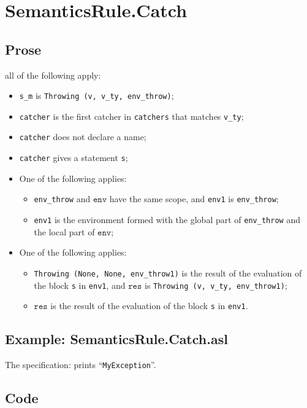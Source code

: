 \documentclass{book}
\newcommand\env[0]{\texttt{env}}
\newcommand\vres[0]{\texttt{res}}
\begin{document}
\section{SemanticsRule.Catch \label{sec:SemanticsRule.Catch}}

    \subsection{Prose}
    all of the following apply:
    \begin{itemize}
    \item \texttt{s\_m} is \texttt{Throwing (v, v\_ty, env\_throw)};
    \item \texttt{catcher} is the first catcher in \texttt{catchers} that matches \texttt{v\_ty};
    \item \texttt{catcher} does not declare a name;
    \item \texttt{catcher} gives a statement \texttt{s};
    \item One of the following applies:
      \begin{itemize}
      \item \texttt{env\_throw} and $\env$ have the same scope, and \texttt{env1} is \texttt{env\_throw};
      \item \texttt{env1} is the environment formed with the global part of \texttt{env\_throw}
        and the local part of $\env$;
      \end{itemize}
    \item One of the following applies:
      \begin{itemize}
      \item \texttt{Throwing (None, None, env\_throw1)} is the result of the evaluation of
        the block \texttt{s} in \texttt{env1}, and $\vres$ is \texttt{Throwing (v, v\_ty, env\_throw1)};
      \item $\vres$ is the result of the evaluation of the block \texttt{s} in \texttt{env1}.
      \end{itemize}
    \end{itemize}

    \subsection{Example: SemanticsRule.Catch.asl}
    The specification:
    prints ``\texttt{MyException}''.

  \subsection{Code}
\end{document}
